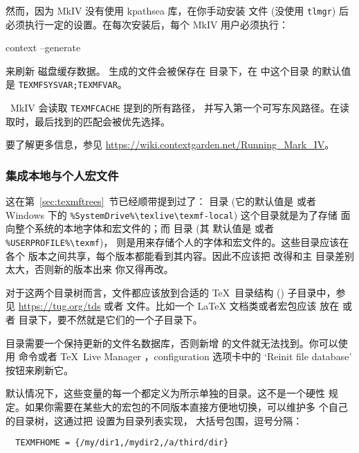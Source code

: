 \documentclass{article}
\begin{document}
然而，因为 \ConTeXt{} MkIV 没有使用 kpathsea 库，在你手动安装
文件 (没使用 \verb+tlmgr+) 后必须执行一定的设置。在每次安装后，每个
MkIV 用户必须执行：

\begin{sverbatim}
context --generate
\end{sverbatim}
来刷新 \ConTeXt{} 磁盘缓存数据。
生成的文件会被保存在  目录下，在 \TL{} 中这个目录
的默认值是 \verb+TEXMFSYSVAR;TEXMFVAR+。

\ConTeXt\ MkIV 会读取 \verb+TEXMFCACHE+ 提到的所有路径，
并写入第一个可写东风路径。在读取时，最后找到的匹配会被优先选择。

要了解更多信息，参见
\url{https://wiki.contextgarden.net/Running_Mark_IV}。

\subsubsection{集成本地与个人宏文件}
\label{sec:local-personal-macros}

这在第~\ref{sec:texmftrees}~节已经顺带提到过了：
目录 (它的默认值是  或者
Windows 下的 \verb|%SystemDrive%\texlive\texmf-local|) 这个目录就是为了存储
面向整个系统的本地字体和宏文件的；而  目录 (其
默认值是  或者 \verb|%USERPROFILE%\texmf|)，
则是用来存储个人的字体和宏文件的。这些目录应该在各个 \TL{}
版本之间共享，每个版本都能看到其内容。因此不应该把
 改得和主 \TL{} 目录差别太大，否则新的版本出来
你又得再改。

对于这两个目录树而言，文件都应该放到合适的 \TeX\ 目录结构 (\TDS)
子目录中，参见 \url{https://tug.org/tds} 或者
 文件。比如一个 \LaTeX{} 文档类或者宏包应该
放在  或者 
目录下，要不然就是它们的一个子目录下。

 目录需要一个保持更新的文件名数据库，否则新增
的文件就无法找到。你可以使用  命令或者
\TeX\ Live Manager \GUI{}，configuration 选项卡中的
`Reinit file database' 按钮来刷新它。

默认情况下，这些变量的每一个都定义为所示单独的目录。这不是一个硬性
规定。如果你需要在某些大的宏包的不同版本直接方便地切换，可以维护多
个自己的目录树，这通过把  设置为目录列表实现，
大括号包围，逗号分隔：

\begin{verbatim}
  TEXMFHOME = {/my/dir1,/mydir2,/a/third/dir}
\end{verbatim}
\end{document}
